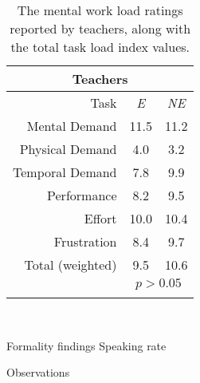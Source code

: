 \begin{table}
	\centering
	\begin{tabular}{r c c}
		\multicolumn{3}{c}{\textbf{Teachers}} \\
		\toprule
		Task			& \textit{E} & \textit{NE} \\
		Mental Demand    & 11.5 & 11.2 \\
		Physical Demand  & 4.0  & 3.2  \\
		Temporal Demand  & 7.8  & 9.9  \\
		Performance      & 8.2  & 9.5  \\
		Effort           & 10.0 & 10.4 \\
		Frustration      & 8.4  & 9.7  \\
		\midrule
		Total (weighted) & 9.5  & 10.6 \\
		& \multicolumn{2}{c}{$p>0.05$} \\
		\bottomrule \\
	\end{tabular}
	\caption{The mental work load ratings reported by teachers, along with the total task load index values.}~\label{tab:table2}
\end{table}

Formality findings
	Speaking rate
	
Observations


